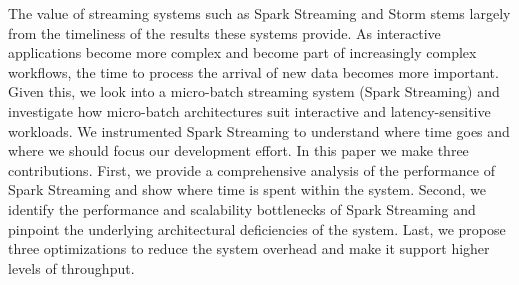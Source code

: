 \noindent 
The value of streaming systems such as Spark Streaming and Storm stems largely from the timeliness of the results these systems provide.
As interactive applications become more complex and become part of increasingly complex workflows, the time to process the arrival of new data becomes more important.
Given this, we look into a micro-batch streaming system (Spark Streaming) and investigate how micro-batch architectures suit interactive and latency-sensitive workloads. 
We instrumented Spark Streaming to understand where time goes and where we should focus our development effort. 
In this paper we make three contributions. 
First, we provide a comprehensive analysis of the performance of Spark Streaming and show where time is spent within the system. 
Second, we identify the performance and scalability bottlenecks of Spark Streaming and pinpoint the underlying architectural deficiencies of the system. 
Last, we propose three optimizations to reduce the system overhead and make it support higher levels of throughput.
        

